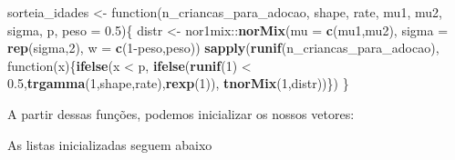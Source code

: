 \documentclass[]{book}
\newenvironment{Shaded}{\begin{snugshade}}{\end{snugshade}}
\newcommand{\KeywordTok}[1]{\textcolor[rgb]{0.13,0.29,0.53}{\textbf{{#1}}}}
\newcommand{\DataTypeTok}[1]{\textcolor[rgb]{0.13,0.29,0.53}{{#1}}}
\newcommand{\DecValTok}[1]{\textcolor[rgb]{0.00,0.00,0.81}{{#1}}}
\newcommand{\FloatTok}[1]{\textcolor[rgb]{0.00,0.00,0.81}{{#1}}}
\newcommand{\StringTok}[1]{\textcolor[rgb]{0.31,0.60,0.02}{{#1}}}
\newcommand{\NormalTok}[1]{{#1}}
\begin{document}
\begin{Shaded}
\begin{Highlighting}[]
\NormalTok{sorteia_idades <-}\StringTok{ }\NormalTok{function(n_criancas_para_adocao, shape, rate, mu1, mu2, sigma, p, }\DataTypeTok{peso =} \FloatTok{0.5}\NormalTok{)\{}
  \NormalTok{distr <-}\StringTok{ }\NormalTok{nor1mix::}\KeywordTok{norMix}\NormalTok{(}\DataTypeTok{mu =} \KeywordTok{c}\NormalTok{(mu1,mu2), }\DataTypeTok{sigma =} \KeywordTok{rep}\NormalTok{(sigma,}\DecValTok{2}\NormalTok{), }\DataTypeTok{w =} \KeywordTok{c}\NormalTok{(}\DecValTok{1}\NormalTok{-peso,peso))}
  \KeywordTok{sapply}\NormalTok{(}\KeywordTok{runif}\NormalTok{(n_criancas_para_adocao), function(x)\{}\KeywordTok{ifelse}\NormalTok{(x <}\StringTok{ }\NormalTok{p, }\KeywordTok{ifelse}\NormalTok{(}\KeywordTok{runif}\NormalTok{(}\DecValTok{1}\NormalTok{) <}\StringTok{ }\FloatTok{0.5}\NormalTok{,}\KeywordTok{trgamma}\NormalTok{(}\DecValTok{1}\NormalTok{,shape,rate),}\KeywordTok{rexp}\NormalTok{(}\DecValTok{1}\NormalTok{)), }\KeywordTok{tnorMix}\NormalTok{(}\DecValTok{1}\NormalTok{,distr))\})}
\NormalTok{\}}
\end{Highlighting}
\end{Shaded}

A partir dessas funções, podemos inicializar os nossos vetores:

As listas inicializadas seguem abaixo
\end{document}
